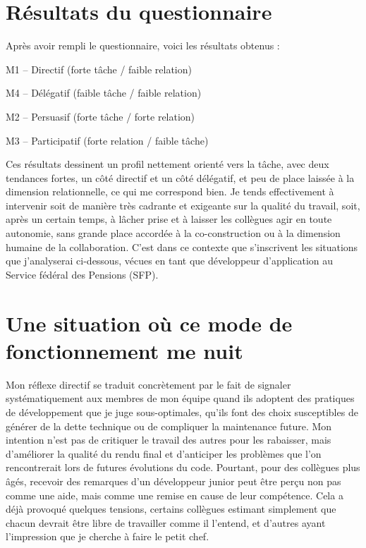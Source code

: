\documentclass[12pt, a4paper]{article}
\begin{document}
\pagestyle{empty}


\newpage
\tableofcontents

\newpage
\setcounter{page}{1}
\pagestyle{fancy}
\section{Résultats du questionnaire}
Après avoir rempli le questionnaire, voici les résultats obtenus :

\begin{description}[leftmargin=4cm, style=sameline, font=\normalfont\bfseries]
  \item[5 pts] M1 -- Directif (forte tâche / faible relation)
  \item[4 pts] M4 -- Délégatif (faible tâche / faible relation)
  \item[3 pts] M2 -- Persuasif (forte tâche / forte relation)
  \item[0 pt] M3 -- Participatif (forte relation / faible tâche)
\end{description}

Ces résultats dessinent un profil nettement orienté 
vers la tâche, avec deux tendances fortes, un côté directif et un côté 
délégatif, et peu de place laissée à la dimension relationnelle, ce qui me correspond bien. Je tends effectivement à intervenir soit de 
manière très cadrante et exigeante sur la qualité du travail, soit, après un certain 
temps, à lâcher prise et à laisser les collègues agir en toute autonomie, sans grande 
place accordée à la co-construction ou à la dimension humaine de la collaboration. 
C'est dans ce contexte que s'inscrivent les situations que j'analyserai ci-dessous, 
vécues en tant que développeur d'application au Service fédéral des Pensions (SFP).

\section{Une situation où ce mode de fonctionnement me nuit}
Mon réflexe directif se traduit concrètement par le fait de signaler 
systématiquement aux membres de mon équipe quand ils adoptent des
pratiques de développement que je juge sous-optimales, qu'ils font des choix susceptibles de générer
de la dette technique ou de compliquer la maintenance future. Mon intention n'est
pas de critiquer le travail des autres pour les rabaisser, mais d'améliorer la qualité du rendu
final et d'anticiper les problèmes que l'on rencontrerait lors de futures évolutions
du code. Pourtant, pour des collègues plus âgés, recevoir des remarques d'un
développeur junior peut être perçu non pas comme une aide, mais comme une remise en
cause de leur compétence. Cela a déjà provoqué quelques tensions, certains
collègues estimant simplement que chacun devrait être libre de travailler comme
il l'entend, et d'autres ayant l'impression que je cherche à faire le petit chef.
\end{document}
